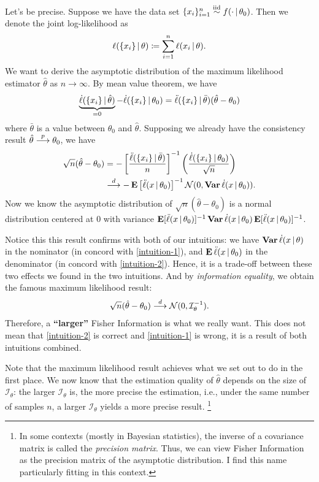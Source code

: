 \documentclass[a4paper]{article}
\begin{document}
Let's be precise.
Suppose we have the data set $\{x_{i}\}_{i=1}^{n}\overset{\text{\scriptsize iid}}{\sim} f(\cdot\,|\,\theta_0)$.
Then we denote the joint log-likelihood as
\begin{align*}
	\ell(\{x_i\}\,|\,\theta) \coloneqq \sum_{i=1}^{n} \ell(x_i\,|\,\theta).
\end{align*}
We want to derive the asymptotic distribution of the maximum likelihood estimator $\hat\theta$ as $n\to\infty$.
By mean value theorem, we have
\begin{align*}
	\underbrace{\dot\ell(\{x_i\}\,|\,\hat\theta)}_{=0}
	- \dot\ell(\{x_i\}\,|\,\theta_{0})
	= \ddot\ell(\{x_i\}\,|\,\bar\theta) (\hat\theta - \theta_0)
\end{align*}
where $\bar\theta$ is a value between $\theta_0$ and $\hat\theta$.
Supposing we already have the consistency result $\hat\theta\overset{p}{\longrightarrow}\theta_0$,
we have
\begin{align*}
	\sqrt{n} ( \hat\theta - \theta_0 )
	&=
	- \left[ \frac{ \ddot\ell(\{x_i\}\,|\,\bar\theta) }{ n } \right]^{-1}
	\left( \frac{ \dot\ell(\{x_i\}\,|\,\theta_{0}) }{ \sqrt{n} } \right) \\
	&\overset{d}{\longrightarrow} - \operatorname{\text{\textrm{\upshape\textbf{E}}}}\left[ \ddot\ell(x\,|\,\theta_0) \right]^{-1} \mathcal{N}(0,\operatorname{\text{\textrm{\upshape\textbf{Var}}}}\dot\ell(x\,|\,\theta_0)).
\end{align*}
Now we know the asymptotic distribution of $\sqrt{n}(\hat\theta-\theta_0)$ is a normal distribution centered at $0$ with variance
$\operatorname{\text{\textrm{\upshape\textbf{E}}}}[\ddot\ell(x\,|\,\theta_0)]^{-1}\operatorname{\text{\textrm{\upshape\textbf{Var}}}}\dot\ell(x\,|\,\theta_0)\operatorname{\text{\textrm{\upshape\textbf{E}}}}[\ddot\ell(x\,|\,\theta_0)]^{-1}$.

Notice this this result confirms with both of our intuitions:
we have $\operatorname{\text{\textrm{\upshape\textbf{Var}}}}\dot\ell(x\,|\,\theta)$ in the nominator (in concord with \autoref{intuition-1}),
and $\operatorname{\text{\textrm{\upshape\textbf{E}}}}\ddot\ell(x\,|\,\theta_0)$ in the denominator (in concord with \autoref{intuition-2}).
Hence, it is a trade-off between these two effects we found in the two intuitions.
And by \emph{information equality}, we obtain the famous maximum likelihood result:
\begin{align*}
	\sqrt{n} ( \hat\theta - \theta_0 ) \overset{d}{\longrightarrow} \mathcal{N}(0,\mathcal{I}_{\theta}^{-1}).
\end{align*}
Therefore, a \textbf{``larger''} Fisher Information is what we really want.
This does not mean that \autoref{intuition-2} is correct and \autoref{intuition-1} is wrong,
it is a result of both intuitions combined.

Note that the maximum likelihood result achieves what we set out to do in the first place.
We now know that the estimation quality of $\hat\theta$ depends on the size of $\mathcal{I}_{\theta}$:
the larger $\mathcal{I}_{\theta}$ is, the more precise the estimation,
i.e., under the same number of samples $n$, a larger $\mathcal{I}_{\theta}$ yields a more precise result.
\footnote{
	In some contexts (mostly in Bayesian statistics),
	the inverse of a covariance matrix is called the \emph{precision matrix}.
	Thus, we can view Fisher Information as the precision matrix of the asymptotic distribution.
	I find this name particularly fitting in this context.
}
\end{document}
